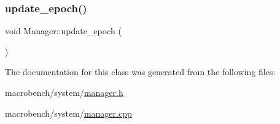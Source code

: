 \subsubsection{\texorpdfstring{update\+\_\+epoch()}{update\_epoch()}}
{\footnotesize\ttfamily void Manager\+::update\+\_\+epoch (\begin{DoxyParamCaption}{ }\end{DoxyParamCaption})}



The documentation for this class was generated from the following files\+:\begin{DoxyCompactItemize}
\item 
macrobench/system/\hyperlink{manager_8h}{manager.\+h}\item 
macrobench/system/\hyperlink{manager_8cpp}{manager.\+cpp}\end{DoxyCompactItemize}
